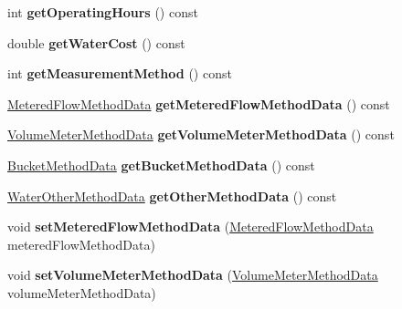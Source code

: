 \begin{DoxyCompactItemize}
\item 
\mbox{\label{class_water_reduction_input_a5729d714bc997517ddd5c2cb669342bf}} 
int {\bfseries get\+Operating\+Hours} () const
\item 
\mbox{\label{class_water_reduction_input_abc82bf5deda166af87b8c1e4282a8551}} 
double {\bfseries get\+Water\+Cost} () const
\item 
\mbox{\label{class_water_reduction_input_ac35bb3e183348ece8e5b7a4d1fbc9e0f}} 
int {\bfseries get\+Measurement\+Method} () const
\item 
\mbox{\label{class_water_reduction_input_ac60726af81042d3ccab564b4592379f5}} 
\hyperlink{class_metered_flow_method_data}{Metered\+Flow\+Method\+Data} {\bfseries get\+Metered\+Flow\+Method\+Data} () const
\item 
\mbox{\label{class_water_reduction_input_ace98f845b1eea761820edc1d41931528}} 
\hyperlink{class_volume_meter_method_data}{Volume\+Meter\+Method\+Data} {\bfseries get\+Volume\+Meter\+Method\+Data} () const
\item 
\mbox{\label{class_water_reduction_input_ae327c2bd833db5da7251c605e27dd1d3}} 
\hyperlink{class_bucket_method_data}{Bucket\+Method\+Data} {\bfseries get\+Bucket\+Method\+Data} () const
\item 
\mbox{\label{class_water_reduction_input_ac18e59397bcb7aee57d7f9cc74bc5d07}} 
\hyperlink{class_water_other_method_data}{Water\+Other\+Method\+Data} {\bfseries get\+Other\+Method\+Data} () const
\item 
\mbox{\label{class_water_reduction_input_adb1fb8446cce129a6c99b298ccb8cc23}} 
void {\bfseries set\+Metered\+Flow\+Method\+Data} (\hyperlink{class_metered_flow_method_data}{Metered\+Flow\+Method\+Data} metered\+Flow\+Method\+Data)
\item 
\mbox{\label{class_water_reduction_input_a6cb184a7e87c8f6602fb4b23fe99d0d3}} 
void {\bfseries set\+Volume\+Meter\+Method\+Data} (\hyperlink{class_volume_meter_method_data}{Volume\+Meter\+Method\+Data} volume\+Meter\+Method\+Data)

\end{DoxyCompactItemize}
